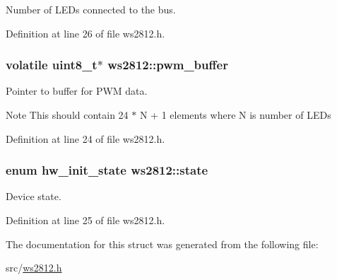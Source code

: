 Number of L\+E\+Ds connected to the bus. 



Definition at line 26 of file ws2812.\+h.

\hypertarget{structws2812_a864f88183104cfbdd144cb301870e655}{}
\subsubsection[{pwm\+\_\+buffer}]{\setlength{\rightskip}{0pt plus 5cm}volatile uint8\+\_\+t$\ast$ ws2812\+::pwm\+\_\+buffer}\label{structws2812_a864f88183104cfbdd144cb301870e655}


Pointer to buffer for P\+W\+M data. 

\begin{DoxyNote}{Note}
This should contain 24 $\ast$ N + 1 elements where N is number of L\+E\+Ds 
\end{DoxyNote}


Definition at line 24 of file ws2812.\+h.

\hypertarget{structws2812_a396b295c928e75adc5688c49c832e631}{}
\subsubsection[{state}]{\setlength{\rightskip}{0pt plus 5cm}enum {\bf hw\+\_\+init\+\_\+state} ws2812\+::state}\label{structws2812_a396b295c928e75adc5688c49c832e631}


Device state. 



Definition at line 25 of file ws2812.\+h.



The documentation for this struct was generated from the following file\+:\begin{DoxyCompactItemize}
\item 
src/\hyperlink{ws2812_8h}{ws2812.\+h}\end{DoxyCompactItemize}
